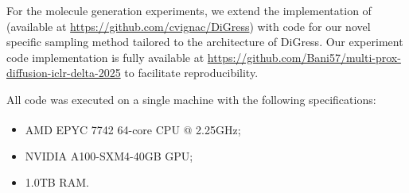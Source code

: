 For the molecule generation experiments, we extend the implementation of \cite{vignac_digress_2022} (available at \url{https://github.com/cvignac/DiGress}) with code for our novel specific sampling method tailored to the architecture of DiGress. Our experiment code implementation is fully available at \url{https://github.com/Bani57/multi-prox-diffusion-iclr-delta-2025} to facilitate reproducibility.

All code was executed on a single machine with the following specifications:
\begin{itemize}
    \item AMD EPYC\textsuperscript{\texttrademark} 7742 64-core CPU @ 2.25GHz;
    \item NVIDIA A100-SXM4-40GB GPU;
    \item 1.0TB RAM. 
\end{itemize}